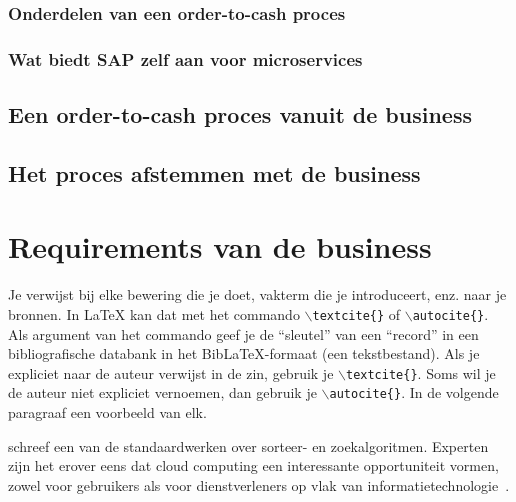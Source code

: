 \subsubsection{Onderdelen van een order-to-cash proces}
\subsubsection{Wat biedt SAP zelf aan voor microservices}
\subsection{Een order-to-cash proces vanuit de business}
\subsection{Het proces afstemmen met de business}

\section{Requirements van de business}
Je verwijst bij elke bewering die je doet, vakterm die je introduceert, enz. naar je bronnen. In \LaTeX{} kan dat met het commando \texttt{$\backslash${textcite\{\}}} of \texttt{$\backslash${autocite\{\}}}. Als argument van het commando geef je de ``sleutel'' van een ``record'' in een bibliografische databank in het Bib\LaTeX{}-formaat (een tekstbestand). Als je expliciet naar de auteur verwijst in de zin, gebruik je \texttt{$\backslash${}textcite\{\}}.
Soms wil je de auteur niet expliciet vernoemen, dan gebruik je \texttt{$\backslash${}autocite\{\}}. In de volgende paragraaf een voorbeeld van elk.

\textcite{Knuth1998} schreef een van de standaardwerken over sorteer- en zoekalgoritmen. Experten zijn het erover eens dat cloud computing een interessante opportuniteit vormen, zowel voor gebruikers als voor dienstverleners op vlak van informatietechnologie~\autocite{Creeger2009}.

\lipsum[7-20]
